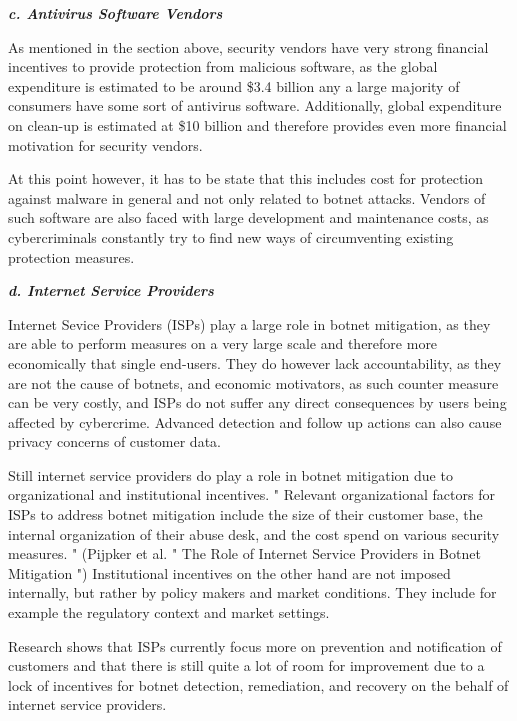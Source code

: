 			\textbf{\textit{c. Antivirus Software Vendors}}
			
		As mentioned in the section above, security vendors have very strong financial incentives to provide protection from malicious software, as the global expenditure is estimated to be around \$3.4 billion any a large majority of consumers have some sort of antivirus software. Additionally, global expenditure on clean-up is estimated at \$10 billion and therefore provides even more financial motivation for security vendors. \cite{Anderson13}

At this point however, it has to be state that this includes cost for protection against malware in general and not only related to botnet attacks. Vendors of such software are also faced with large development and maintenance costs, as cybercriminals constantly try to find new ways of circumventing existing protection measures.

			\textbf{\textit{d. Internet Service Providers}}
			
		Internet Sevice Providers (ISPs) play a large role in botnet mitigation, as they are able to perform measures on a very large scale and therefore more economically that single end-users. They do however lack accountability, as they are not the cause of botnets, and economic motivators, as such counter measure can be very costly, and ISPs do not suffer any direct consequences by users being affected by cybercrime. Advanced detection and follow up actions can also cause privacy concerns of customer data. \cite{Pijpker16}

Still internet service providers do play a role in botnet mitigation due to organizational and institutional incentives. " Relevant organizational factors for ISPs to address botnet mitigation include the size of their customer base, the internal organization of their abuse desk, and the cost spend on various security measures. " (Pijpker et al. " The Role of Internet Service Providers in Botnet Mitigation ") Institutional incentives on the other hand are not imposed internally, but rather by policy makers and market conditions. They include for example the regulatory context and market settings. \cite{Pijpker16}

Research shows that ISPs currently focus more on prevention and notification of customers and that there is still quite a lot of room for improvement due to a lock of incentives for botnet detection, remediation, and recovery on the behalf of internet service providers. \cite{Pijpker16}

